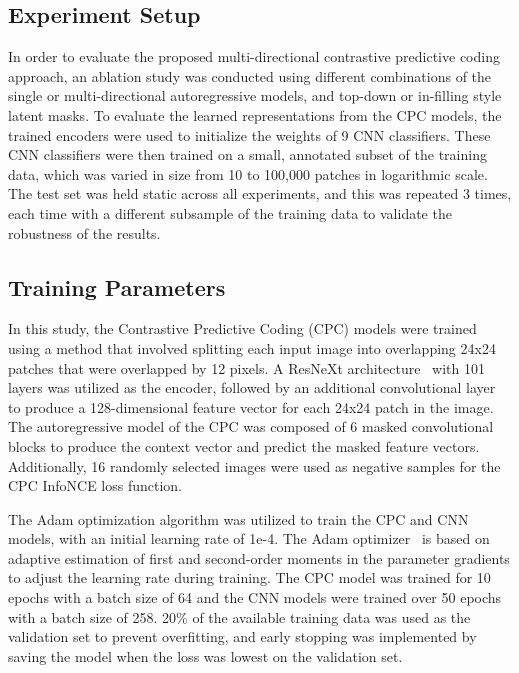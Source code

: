 \subsection{Experiment Setup}
\label{subsec:unsupervised_experiment}
In order to evaluate the proposed multi-directional contrastive predictive coding approach, an ablation study was conducted using different combinations of the single or multi-directional autoregressive models, and top-down or in-filling style latent masks. To evaluate the learned representations from the CPC models, the trained encoders were used to initialize the weights of 9 CNN classifiers. These CNN classifiers were then trained on a small, annotated subset of the training data, which was varied in size from 10 to 100,000 patches in logarithmic scale. The test set was held static across all experiments, and this was repeated 3 times, each time with a different subsample of the training data to validate the robustness of the results.

\subsection{Training Parameters}
\label{subsec:unsupervised_training}
In this study, the Contrastive Predictive Coding (CPC) models were trained using a method that involved splitting each input image into overlapping 24x24 patches that were overlapped by 12 pixels. A ResNeXt architecture~\citep{xie2017aggregated} with 101 layers was utilized as the encoder, followed by an additional convolutional layer to produce a 128-dimensional feature vector for each 24x24 patch in the image. The autoregressive model of the CPC was composed of 6 masked convolutional blocks to produce the context vector and predict the masked feature vectors. Additionally, 16 randomly selected images were used as negative samples for the CPC InfoNCE loss function.

The Adam optimization algorithm was utilized to train the CPC and CNN models, with an initial learning rate of 1e-4. The Adam optimizer~\citep{kingma2014adam} is based on adaptive estimation of first and second-order moments in the parameter gradients to adjust the learning rate during training. The CPC model was trained for 10 epochs with a batch size of 64 and the CNN models were trained over 50 epochs with a batch size of 258. 20\% of the available training data was used as the validation set to prevent overfitting, and early stopping was implemented by saving the model when the loss was lowest on the validation set.

